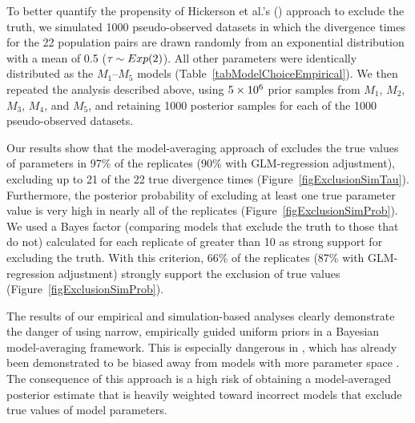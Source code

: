 \documentclass[letterpaper,12pt]{article}
\begin{document}
\begin{linenumbers}
To better quantify the propensity of Hickerson et al.'s
(\citeyear{Hickerson2013}) approach to exclude the truth, we simulated
1000 pseudo-observed datasets in which the divergence times for the
22 population pairs are drawn randomly from an exponential distribution
with a mean of 0.5 ($\tau_{} \sim Exp(2)$).
All other parameters were identically distributed as the $M_1$--$M_5$ models
(Table~\ref{tabModelChoiceEmpirical}).
We then repeated the analysis described above, using $5\times 10^{6}$ prior samples from
$M_1$, $M_2$, $M_3$, $M_4$, and $M_5$, and retaining 1000 posterior samples
for each of the 1000 pseudo-observed datasets.

Our results show that the model-averaging approach of \citet{Hickerson2013}
excludes the true values of parameters in 97\% of the replicates (90\% with
GLM-regression adjustment), excluding up to 21 of the 22 true divergence times
(Figure~\ref{figExclusionSimTau}).
Furthermore, the posterior probability of excluding at least one true parameter
value is very high in nearly all of the replicates
(Figure~\ref{figExclusionSimProb}).
We used a Bayes factor (comparing models that exclude the truth to those that
do not) calculated for each replicate of greater than 10 as strong support for
excluding the truth.
With this criterion, 66\% of the replicates (87\% with GLM-regression adjustment)
strongly support the exclusion of true values (Figure~\ref{figExclusionSimProb}).

The results of our empirical and simulation-based analyses clearly demonstrate
the danger of using narrow, empirically guided uniform priors in a Bayesian
model-averaging framework.
This is especially dangerous in \msb, which has already been demonstrated to be
biased away from models with more parameter space \citep{Oaks2012}.
The consequence of this approach is a high risk of obtaining a model-averaged
posterior estimate that is heavily weighted toward incorrect models that
exclude true values of model parameters.



\end{linenumbers}
\end{document}
